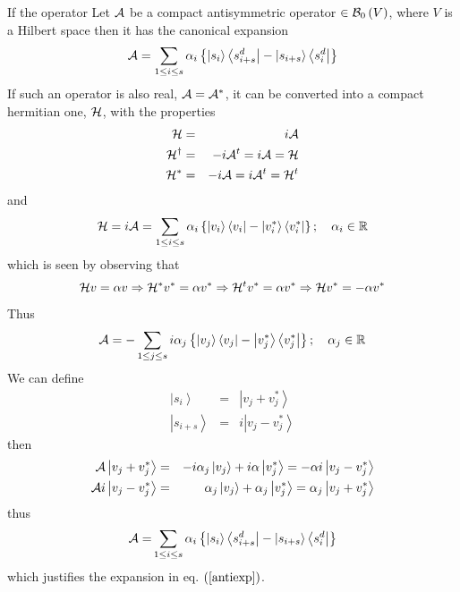If the operator Let ${\cal A}$ be a compact antisymmetric operator $\in 
{\cal B}_{0}\left( V\right) $, where $V$ is a Hilbert space then it has the
canonical expansion 
\begin{equation}
{\cal A}=\sum_{1\leq i\leq s}\alpha _{i}\left\{ \left| s_{i}\right\rangle
\left\langle s_{i+s}^{d}\right| -\left| s_{i+s}\right\rangle \left\langle
s_{i}^{d}\right| \right\}  \label{antiexp}
\end{equation}%
If such an operator is also real, ${\cal A}={\cal A}^{\ast }$, it can be
converted into a compact hermitian one, ${\cal H}$, with the properties 
\begin{eqnarray}
{\cal H} &=&i{\cal A}  \nonumber \\
{\cal H}^{\dagger } &=&-i{\cal A}^{t}=i{\cal A}={\cal H}  \nonumber \\
{\cal H}^{\ast } &=&-i{\cal A}=i{\cal A}^{t}={\cal H}^{t}
\end{eqnarray}%
and 
\begin{equation}
{\cal H}=i{\cal A}=\sum_{1\leq i\leq s}\alpha _{i}\left\{ \left|
v_{i}\right\rangle \left\langle v_{i}\right| -\left| v_{i}^{\ast
}\right\rangle \left\langle v_{i}^{\ast }\right| \right\} ;\quad \alpha
_{i}\in {\Bbb R}
\end{equation}%
which is seen by observing that 
\begin{equation}
{\cal H}v=\alpha v\Rightarrow {\cal H}^{\ast }v^{\ast }=\alpha v^{\ast
}\Rightarrow {\cal H}^{t}v^{\ast }=\alpha v^{\ast }\Rightarrow {\cal H}%
v^{\ast }=-\alpha v^{\ast }
\end{equation}%
Thus 
\begin{equation}
{\cal A}=-\sum_{1\leq j\leq s}i\alpha _{j}\left\{ \left| v_{j}\right\rangle
\left\langle v_{j}\right| -\left| v_{j}^{\ast }\right\rangle \left\langle
v_{j}^{\ast }\right| \right\} ;\quad \alpha _{j}\in {\Bbb R}
\end{equation}%
We can define 
\begin{eqnarray}
\left| s_{i}\right\rangle &=&\left| v_{j}+v_{j}^{\ast }\right\rangle 
\nonumber \\
\left| s_{i+s}\right\rangle &=&i\left| v_{j}-v_{j}^{\ast }\right\rangle
\end{eqnarray}%
then 
\begin{eqnarray}
{\cal A}\left| v_{j}+v_{j}^{\ast }\right\rangle &=&-i\alpha _{j}\left|
v_{j}\right\rangle +i\alpha \left| v_{j}^{\ast }\right\rangle =-\alpha
i\left| v_{j}-v_{j}^{\ast }\right\rangle  \nonumber \\
{\cal A}i\left| v_{j}-v_{j}^{\ast }\right\rangle &=&\alpha _{j}\left|
v_{j}\right\rangle +\alpha _{j}\left| v_{j}^{\ast }\right\rangle =\alpha
_{j}\left| v_{j}+v_{j}^{\ast }\right\rangle
\end{eqnarray}%
thus 
\begin{equation}
{\cal A=}\sum_{1\leq i\leq s}\alpha _{i}\left\{ \left| s_{i}\right\rangle
\left\langle s_{i+s}^{d}\right| -\left| s_{i+s}\right\rangle \left\langle
s_{i}^{d}\right| \right\}
\end{equation}%
which justifies the expansion in eq. $\left( \ref{antiexp}\right) $.
